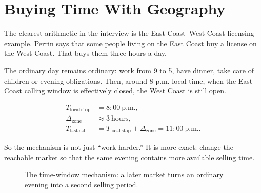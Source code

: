 \section{Buying Time With Geography}

The clearest arithmetic in the interview is the East Coast--West Coast licensing example. Perrin says that some people living on the East Coast buy a license on the West Coast. That buys them three hours a day.

The ordinary day remains ordinary: work from 9 to 5, have dinner, take care of children or evening obligations. Then, around 8 p.m. local time, when the East Coast calling window is effectively closed, the West Coast is still open.

\begin{align}
T_{\mathrm{local\ stop}} &= 8{:}00\ \mathrm{p.m.},\\
\Delta_{\mathrm{zone}} &\approx 3\ \mathrm{hours},\\
T_{\mathrm{last\ call}} &= T_{\mathrm{local\ stop}}+\Delta_{\mathrm{zone}}
= 11{:}00\ \mathrm{p.m.}.
\end{align}

So the mechanism is not just ``work harder.'' It is more exact: change the reachable market so that the same evening contains more available selling time.

\begin{figure}
\centering
{}
\caption{The time-window mechanism: a later market turns an ordinary evening into a second selling period.}
\end{figure}

